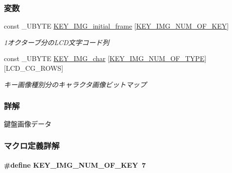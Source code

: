 \subsubsection*{変数}
\begin{DoxyCompactItemize}
\item 
const \+\_\+\+U\+B\+Y\+T\+E \hyperlink{key__image_8h_aac267b2e32d4518bd2661895e8667365_aac267b2e32d4518bd2661895e8667365}{K\+E\+Y\+\_\+\+I\+M\+G\+\_\+initial\+\_\+frame} \mbox{[}\hyperlink{key__image_8h_a6e24b4d8bd16a740050b1d5acfd8a6f1_a6e24b4d8bd16a740050b1d5acfd8a6f1}{K\+E\+Y\+\_\+\+I\+M\+G\+\_\+\+N\+U\+M\+\_\+\+O\+F\+\_\+\+K\+E\+Y}\mbox{]}
\begin{DoxyCompactList}\small\item\em 1オクターブ分の\+L\+C\+D文字コード列 \end{DoxyCompactList}\item 
const \+\_\+\+U\+B\+Y\+T\+E \hyperlink{key__image_8h_ad8bcb9deb96dec3ecacf43106f0f845d_ad8bcb9deb96dec3ecacf43106f0f845d}{K\+E\+Y\+\_\+\+I\+M\+G\+\_\+char} \mbox{[}\hyperlink{key__image_8h_ac00361390d99656f240e21132bd160cc_ac00361390d99656f240e21132bd160ccab5fb40b7e7e274990691f53fff111986}{K\+E\+Y\+\_\+\+I\+M\+G\+\_\+\+N\+U\+M\+\_\+\+O\+F\+\_\+\+T\+Y\+P\+E}\mbox{]}\mbox{[}L\+C\+D\+\_\+\+C\+G\+\_\+\+R\+O\+W\+S\mbox{]}
\begin{DoxyCompactList}\small\item\em キー画像種別分のキャラクタ画像ビットマップ \end{DoxyCompactList}\end{DoxyCompactItemize}


\subsubsection{詳解}
鍵盤画像データ 

 

\subsubsection{マクロ定義詳解}
\paragraph[{K\+E\+Y\+\_\+\+I\+M\+G\+\_\+\+N\+U\+M\+\_\+\+O\+F\+\_\+\+K\+E\+Y}]{\setlength{\rightskip}{0pt plus 5cm}\#define K\+E\+Y\+\_\+\+I\+M\+G\+\_\+\+N\+U\+M\+\_\+\+O\+F\+\_\+\+K\+E\+Y~7}\label{key__image_8h_a6e24b4d8bd16a740050b1d5acfd8a6f1_a6e24b4d8bd16a740050b1d5acfd8a6f1}


